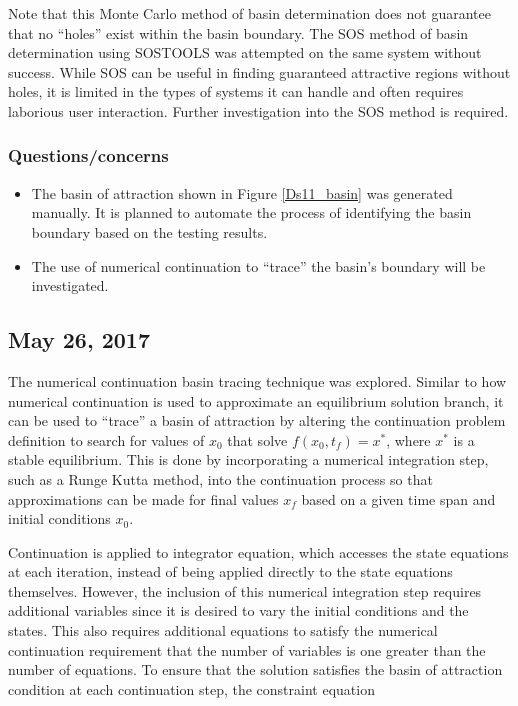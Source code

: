 \documentclass[12pt]{article}
\begin{document}
Note that this Monte Carlo method of basin determination does not guarantee that no ``holes'' exist within the basin boundary. The SOS method of basin determination using SOSTOOLS \cite{sostools} was attempted on the same system without success. While SOS can be useful in finding guaranteed attractive regions without holes, it is limited in the types of systems it can handle and often requires laborious user interaction. Further investigation into the SOS method is required.

\subsubsection{Questions/concerns}
\begin{itemize}
\item The basin of attraction shown in Figure \ref{Ds11_basin} was generated manually. It is planned to automate the process of identifying the basin boundary based on the testing results.
\item The use of numerical continuation to ``trace'' the basin's boundary will be investigated. 
\end{itemize}


\subsection{May 26, 2017}
\label{may26}
The numerical continuation basin tracing technique was explored. Similar to how numerical continuation is used to approximate an equilibrium solution branch, it can be used to ``trace'' a basin of attraction by altering the continuation problem definition to search for values of $x_0$ that solve $f(x_0,t_f)=x^*$, where $x^*$ is a stable equilibrium. This is done by incorporating a numerical integration step, such as a Runge Kutta method, into the continuation process so that approximations can be made for final values $x_f$ based on a given time span and initial conditions $x_0$. 

Continuation is applied to integrator equation, which accesses the state equations at each iteration, instead of being applied directly to the state equations themselves. However, the inclusion of this numerical integration step requires additional variables since it is desired to vary the initial conditions and the states. This also requires additional equations to satisfy the numerical continuation requirement that the number of variables is one greater than the number of equations. To ensure that the solution satisfies the basin of attraction condition at each continuation step, the constraint equation
\end{document}
